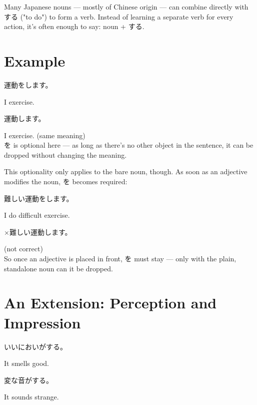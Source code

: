 \documentclass[12pt]{book}
\begin{document}
Many Japanese nouns — mostly of Chinese origin — can combine directly with する ("to do") to form a verb. Instead of learning a separate verb for every action, it's often enough to say: noun + する.

\section*{Example}

\par\quad 運動をします。\\
\par\quad I exercise.\\

\par\quad 運動します。\\
\par\quad I exercise. (same meaning)\\

を is optional here — as long as there's no other object in the sentence, it can be dropped without changing the meaning.

This optionality only applies to the bare noun, though. As soon as an adjective modifies the noun, を becomes required:

\par\quad 難しい運動をします。\\
\par\quad I do difficult exercise.\\

\par\quad ×難しい運動します。\\
\par\quad (not correct)\\

So once an adjective is placed in front, を must stay — only with the plain, standalone noun can it be dropped.

\section*{An Extension: Perception and Impression}

\par\quad いいにおいがする。\\
\par\quad It smells good.\\

\par\quad 変な音がする。\\
\par\quad It sounds strange.\\
\end{document}
